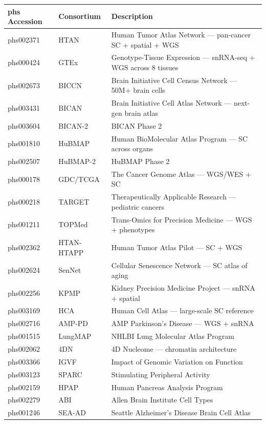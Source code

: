 \documentclass[11pt,letterpaper]{article}
\begin{document}
\begin{longtable}{@{} l l p{7.5cm} @{}}
\toprule
\textbf{phs Accession} & \textbf{Consortium} & \textbf{Description} \\
\midrule
\endhead
phs002371 & HTAN & Human Tumor Atlas Network --- pan-cancer SC + spatial + WGS \\
phs000424 & GTEx & Genotype-Tissue Expression --- snRNA-seq + WGS across 8 tissues \\
phs002673 & BICCN & Brain Initiative Cell Census Network --- 50M+ brain cells \\
phs003431 & BICAN & Brain Initiative Cell Atlas Network --- next-gen brain atlas \\
phs003604 & BICAN-2 & BICAN Phase 2 \\
phs001810 & HuBMAP & Human BioMolecular Atlas Program --- SC across organs \\
phs002507 & HuBMAP-2 & HuBMAP Phase 2 \\
phs000178 & GDC/TCGA & The Cancer Genome Atlas --- WGS/WES + SC \\
phs000218 & TARGET & Therapeutically Applicable Research --- pediatric cancers \\
phs001211 & TOPMed & Trans-Omics for Precision Medicine --- WGS + phenotypes \\
phs002362 & HTAN-HTAPP & Human Tumor Atlas Pilot --- SC + WGS \\
phs002624 & SenNet & Cellular Senescence Network --- SC atlas of aging \\
phs002256 & KPMP & Kidney Precision Medicine Project --- snRNA + spatial \\
phs003169 & HCA & Human Cell Atlas --- large-scale SC reference \\
phs002716 & AMP-PD & AMP Parkinson's Disease --- WGS + snRNA \\
phs001515 & LungMAP & NHLBI Lung Molecular Atlas Program \\
phs002062 & 4DN & 4D Nucleome --- chromatin architecture \\
phs003366 & IGVF & Impact of Genomic Variation on Function \\
phs003123 & SPARC & Stimulating Peripheral Activity \\
phs002159 & HPAP & Human Pancreas Analysis Program \\
phs002279 & ABI & Allen Brain Institute Cell Types \\
phs001246 & SEA-AD & Seattle Alzheimer's Disease Brain Cell Atlas \\
\bottomrule
\end{longtable}
\end{document}
